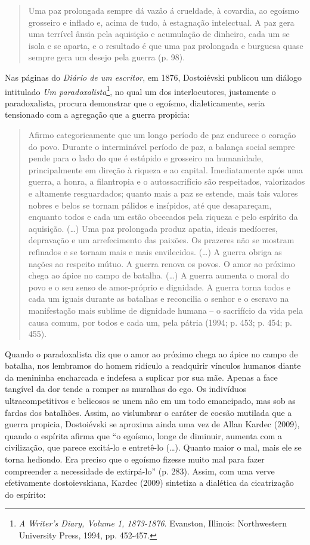 \begin{quote}
Uma paz prolongada sempre dá vazâo á crueldade, à covardia, ao egoísmo
grosseiro e inflado e, acima de tudo, à estagnação intelectual. A paz
gera uma terrível ânsia pela aquisição e acumulação de dinheiro, cada um
se isola e se aparta, e o resultado é que uma paz prolongada e burguesa
quase sempre gera um desejo pela guerra (p. 98).
\end{quote}

Nas páginas do \emph{Diário de um escritor}, em 1876, Dostoiévski
publicou um diálogo intitulado \emph{Um paradoxalista}\footnote{\emph{A
  Writer's Diary, Volume 1, 1873-1876}. Evanston, Illinois: Northwestern
  University Press, 1994, pp. 452-457.}, no qual um dos interlocutores,
justamente o paradoxalista, procura demonstrar que o egoísmo,
dialeticamente, seria tensionado com a agregação que a guerra propicia:

\begin{quote}
Afirmo categoricamente que um longo período de paz endurece o coração do
povo. Durante o interminável período de paz, a balança social sempre
pende para o lado do que é estúpido e grosseiro na humanidade,
principalmente em direção à riqueza e ao capital. Imediatamente após uma
guerra, a honra, a filantropia e o autossacrifício são respeitados,
valorizados e altamente resguardados; quanto mais a paz se estende, mais
tais valores nobres e belos se tornam pálidos e insípidos, até que
desapareçam, enquanto todos e cada um estão obcecados pela riqueza e
pelo espírito da aquisição. (\ldots{}) Uma paz prolongada produz apatia,
ideais medíocres, depravação e um arrefecimento das paixões. Os prazeres
não se mostram refinados e se tornam mais e mais envilecidos. (\ldots{})
A guerra obriga as nações ao respeito mútuo. A guerra renova os povos. O
amor ao próximo chega ao ápice no campo de batalha. (\ldots{}) A guerra
aumenta o moral do povo e o seu senso de amor-próprio e dignidade. A
guerra torna todos e cada um iguais durante as batalhas e reconcilia o
senhor e o escravo na manifestação mais sublime de dignidade humana -- o
sacrifício da vida pela causa comum, por todos e cada um, pela pátria
(1994; p. 453; p. 454; p. 455).
\end{quote}

Quando o paradoxalista diz que o amor ao próximo chega ao ápice no campo
de batalha, nos lembramos do homem ridículo a readquirir vínculos
humanos diante da menininha encharcada e indefesa a suplicar por sua
mãe. Apenas a face tangível da dor tende a romper as muralhas do ego. Os
indivíduos ultracompetitivos e belicosos se unem não em um todo
emancipado, mas sob as fardas dos batalhões. Assim, ao vislumbrar o
caráter de coesão mutilada que a guerra propicia, Dostoiévski se
aproxima ainda uma vez de Allan Kardec (2009), quando o espírita afirma
que ``o egoísmo, longe de diminuir, aumenta com a civilização, que
parece excitá-lo e entretê-lo (\ldots{}). Quanto maior o mal, mais ele
se torna hediondo. Era preciso que o egoísmo fizesse muito mal para
fazer compreender a necessidade de extirpá-lo'' (p. 283). Assim, com uma
verve efetivamente dostoievskiana, Kardec (2009) sintetiza a dialética
da cicatrização do espírito:


